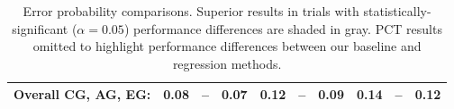 \documentclass[12pt]{cmuthesis}
\begin{document}
\begin{table}[!htbp]
\begin{center}
\begin{tabular} {||c||c|c|c||c|c|c||c|c|c||}
\hline
\hline
\hline
Overall CG, AG, EG: & \bf{0.08} & \bf{--} & \cellcolor[gray]{0.8}\bf{0.07} & \bf{0.12} & \bf{--} & \cellcolor[gray]{0.8}\bf{0.09} & \bf{0.14} & -- & \cellcolor[gray]{0.8}\bf{0.12}\\
\hline
\end{tabular}
\caption{Error probability comparisons. Superior results in trials with statistically-significant ($\alpha=0.05$) performance differences are shaded in gray. PCT results omitted to highlight performance differences between our baseline and regression methods.}
\label{tab:mcnemar-RWC}
\end{center}
\end{table}

\end{document}

